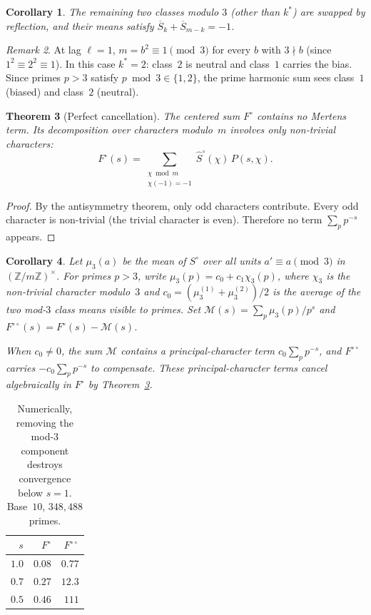 \documentclass[12pt]{amsart}
\newtheorem{theorem}{Theorem}
\newtheorem{corollary}[theorem]{Corollary}
\theoremstyle{definition}
\theoremstyle{remark}
\newtheorem{remark}[theorem]{Remark}
\begin{document}
\begin{corollary}\label{cor:swap}
The remaining two classes modulo $3$ (other than
$k^{*}$) are swapped by reflection, and their means
satisfy
$\overline{S}_{k} + \overline{S}_{m-k} = -1$.
\end{corollary}

\begin{remark}
At lag $\ell = 1$, $m = b^2 \equiv 1 \pmod{3}$ for
every $b$ with $3 \nmid b$ (since $1^2 \equiv
2^2 \equiv 1$). In this case $k^{*} = 2$: class~$2$
is neutral and class~$1$ carries the bias. Since
primes $p > 3$ satisfy $p \bmod 3 \in \{1, 2\}$,
the prime harmonic sum sees class~$1$ (biased) and
class~$2$ (neutral).
\end{remark}

\begin{theorem}[Perfect cancellation]\label{thm:cancel}
The centered sum $F^{\circ}$ contains no Mertens term.
Its decomposition over characters modulo~$m$ involves
only non-trivial characters:
\[
F^{\circ}(s) = \sum_{\substack{\chi \bmod m \\
\chi(-1) = -1}} \hat{S}^{\circ}(\chi)\, P(s, \chi).
\]
\end{theorem}

\begin{proof}
By the antisymmetry theorem, only odd characters
contribute. Every odd character is non-trivial (the
trivial character is even). Therefore no term
$\sum_p p^{-s}$ appears.
\end{proof}

\begin{corollary}
Let $\mu_3(a)$ be the mean of $S^{\circ}$ over all
units $a' \equiv a \pmod{3}$ in
$(\mathbb{Z}/m\mathbb{Z})^{\times}$. For primes
$p > 3$, write $\mu_3(p) = c_0 + c_1 \chi_3(p)$,
where $\chi_3$ is the non-trivial character
modulo~$3$ and
$c_0 = (\mu_3^{(1)} + \mu_3^{(2)})/2$ is the average
of the two mod-$3$ class means visible to primes. Set
$\mathcal{M}(s) = \sum_p \mu_3(p)/p^s$ and
$F^{\circ\circ}(s) = F^{\circ}(s) - \mathcal{M}(s)$.

When $c_0 \ne 0$, the sum $\mathcal{M}$ contains a
principal-character term $c_0 \sum_p p^{-s}$, and
$F^{\circ\circ}$ carries $-c_0 \sum_p p^{-s}$ to
compensate. These principal-character terms cancel
algebraically in $F^{\circ}$ by
Theorem~\ref{thm:cancel}.
\end{corollary}

\begin{table}[h]
\centering
\begin{tabular}{rrr}
\toprule
$s$ & $F^{\circ}$ & $F^{\circ\circ}$ \\
\midrule
$1.0$ & $0.08$ & $0.77$ \\
$0.7$ & $0.27$ & $12.3$ \\
$0.5$ & $0.46$ & $111$ \\
\bottomrule
\end{tabular}
\caption{Numerically, removing the mod-$3$ component
destroys convergence below $s = 1$. Base~$10$,
$348{,}488$ primes.}
\end{table}
\end{document}
